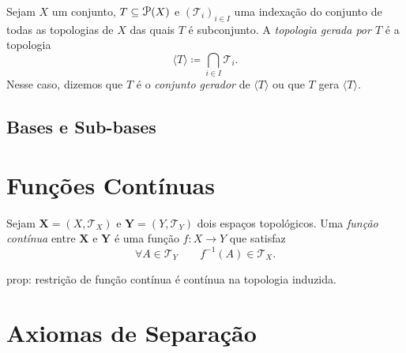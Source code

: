 

\begin{defi}
	Sejam $X$ um conjunto, $T \subseteq \p(X)$ e $(\mathcal T_i)_{i \in I}$ uma indexação do conjunto de todas as topologias de $X$ das quais $T$ é subconjunto. A \emph{topologia gerada por $T$} é a topologia
	\begin{equation*}
	\langle T \rangle \coloneqq \bigcap_{i \in I} \mathcal T_i.
	\end{equation*}
Nesse caso, dizemos que $T$ é o \emph{conjunto gerador} de $\langle T \rangle$ ou que $T$ gera $\langle T \rangle$.
\end{defi}

\section{Bases e Sub-bases}


\chapter{Funções Contínuas}

\begin{defi}
	Sejam $\bm X = (X,\mathcal T_X)$ e $\bm Y = (Y,\mathcal T_Y)$ dois espaços topológicos. Uma \emph{função contínua} entre $\bm X$ e $\bm Y$ é uma função $f: X \to Y$ que satisfaz
	\begin{equation*}
	\forall A \in \mathcal T_Y \qquad f^{-1}(A) \in \mathcal T_X.
	\end{equation*}
\end{defi}


prop: restrição de função contínua é contínua na topologia induzida.




\chapter{Axiomas de Separação}

